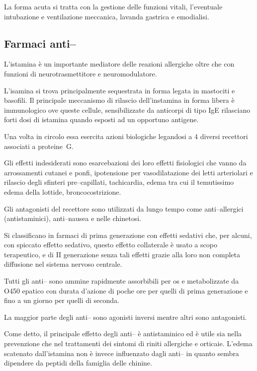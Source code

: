 La forma acuta si tratta con la gestione delle funzioni vitali, l'eventuale intubazione e ventilazione meccanica, lavanda gastrica e emodialisi.

\subsection{Farmaci anti--}

L'istamina è un importante mediatore delle reazioni allergiche oltre che con funzioni di neurotrasmettitore e neuromodulatore.

L'isamina si trova principalmente sequestrata in forma legata in mastociti e basofili. Il principale meccanismo di rilascio dell'instamina in forma libera è immunologico ove queste cellule, sensibilizzate da anticorpi di tipo IgE rilasciano forti dosi di istamina quando esposti ad un opportuno antigene.

Una volta in circolo essa esercita azioni biologiche legandosi a 4 diversi recettori  associati a proteine~G.

Gli effetti indesiderati sono esarcebazioni dei loro effetti fisiologici che vanno da arrossamenti cutanei e ponfi, ipotensione per vasodilatazione dei letti arteriolari e rilascio degli sfinteri pre--capillati, tachicardia, edema tra cui il temutissimo edema della lottide, broncocostrizione.

Gli antagonisti del recettore  sono utilizzati da lungo tempo come anti--allergici (antistaminici), anti--nausea e nelle chinetosi.

Si classificano in farmaci di prima generazione con effetti sedativi che, per alcuni, con spiccato effetto sedativo, questo effetto collaterale è usato a scopo terapeutico, e di II generazione senza tali effetti grazie alla loro non completa diffusione nel sistema nervoso centrale.

Tutti gli anti-- sono ammine rapidmente assorbibili per os e metabolizzate da O450 epatico con durata d'azione di poche ore per quelli di prima generazione e fino a un giorno per quelli di seconda.

La maggior parte degli anti-- sono agonisti inversi mentre altri sono antagonisti.

Come detto, il principale effetto degli anti-- è antistaminico ed è utile sia nella prevenzione che nel trattamenti dei sintomi di riniti allergiche e orticaie. L'edema scatenato dall'istamina non è invece influenzato dagli anti-- in quanto sembra dipendere da peptidi della famiglia delle chinine.

